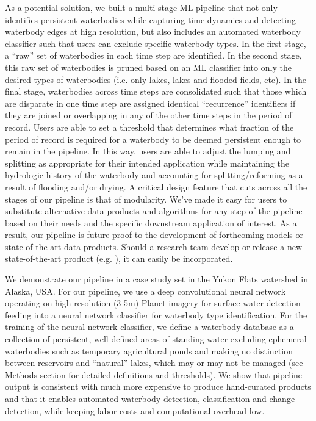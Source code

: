 \documentclass{article}
\begin{document}
As a potential solution, we built a multi-stage ML pipeline that not only identifies persistent waterbodies while capturing time dynamics and detecting waterbody edges at high resolution, but also includes an automated waterbody classifier such that users can exclude specific waterbody types. In the first stage, a “raw” set of waterbodies in each time step are identified. In the second stage, this raw set of waterbodies is pruned based on an ML classifier into only the desired types of waterbodies (i.e. only lakes, lakes and flooded fields, etc). In the final stage, waterbodies across time steps are consolidated such that those which are disparate in one time step are assigned identical “recurrence” identifiers if they are joined or overlapping in any of the other time steps in the period of record. Users are able to set a threshold that determines what fraction of the period of record is required for a waterbody to be deemed persistent enough to remain in the pipeline. In this way, users are able to adjust the lumping and splitting as appropriate for their intended application while maintaining the hydrologic history of the waterbody and accounting for splitting/reforming as a result of flooding and/or drying. A critical design feature that cuts across all the stages of our pipeline is that of modularity. We've made it easy for users to substitute alternative data products and algorithms for any step of the pipeline based on their needs and the specific downstream application of interest. As a result, our pipeline is future-proof to the development of forthcoming models or state-of-the-art data products. Should a research team develop or release a new state-of-the-art product (e.g. \citet{mullenUsingHighResolution2023}), it can easily be incorporated.

We demonstrate our pipeline in a case study set in the Yukon Flats watershed in Alaska, USA. For our pipeline, we use a deep convolutional neural network operating on high resolution (3-5m) Planet imagery for surface water detection feeding into a neural network classifier for waterbody type identification. For the training of the neural network classifier, we define a waterbody database as a collection of persistent, well-defined areas of standing water excluding ephemeral waterbodies such as temporary agricultural ponds and making no distinction between reservoirs and “natural” lakes, which may or may not be managed (see Methods section for detailed definitions and thresholds). We show that pipeline output is consistent with much more expensive to produce hand-curated products and that it enables automated waterbody detection, classification and change detection, while keeping labor costs and computational overhead low. 
\end{document}
